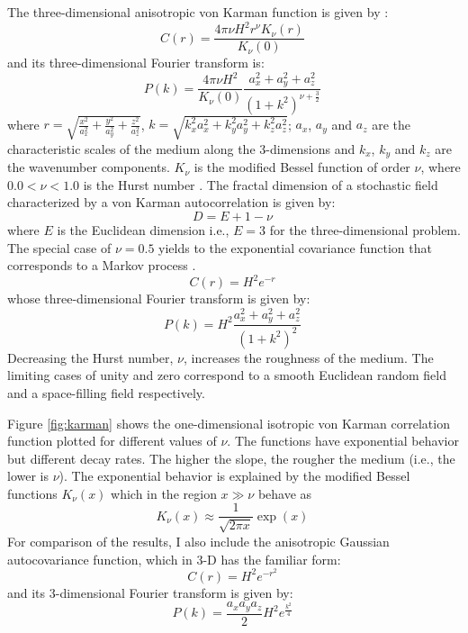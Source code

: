 The three-dimensional anisotropic von Karman function is given by \cite{Goff}:
\begin{equation}
C(r)=\frac{4\pi{\nu}H^2r^{\nu}K_{\nu}(r)}{K_{\nu}(0)} \
\label {eq7}
\end{equation}
and its three-dimensional Fourier transform is:
\begin{equation}
P(k)=\frac{4\pi{\nu}H^2}{K_{\nu}(0)}\frac{a_x^2+a_y^2+a_z^2}{{(1+k^2)}^{\nu+\frac {3} {2}}} \
\label {eq8}
\end{equation}
where $r=\sqrt{\frac{x^2}{a_x^2}+\frac{y^2}{a_y^2}+\frac{z^2}{a_z^2}}$,
 $k=\sqrt{k_x^2a_x^2+k_y^2a_y^2+k_z^2a_z^2}$;   
$a_x$, $a_y$ and $a_z$ are the characteristic scales of the medium along the 
3-dimensions and $k_x$, $k_y$ and $k_z$ are the wavenumber components. 
$K_\nu$ is the modified Bessel function of order $\nu$, 
where $0.0<\nu<1.0$ is the 
Hurst number \cite{Mandelbrot1,Mandelbrot2}. The fractal dimension of a stochastic
field characterized by a von Karman autocorrelation is given by:
\begin{equation}
D=E+1-\nu \
\label {eq0}
\end{equation}
where $E$ is the Euclidean dimension i.e., $E=3$ for the three-dimensional problem.
The special case of $\nu=0.5$ yields to the exponential covariance 
function that corresponds to a Markov process \cite{Feller}.
\begin{equation}
C(r)=H^2e^{-r} \
\label {eq9}
\end{equation}
whose three-dimensional Fourier transform is given by:
\begin{equation}
P(k)=H^2\frac{a_x^2+a_y^2+a_z^2}{{(1+k^2)}^{2}} \
\label {eq10}
\end{equation}
%
%
Decreasing the Hurst number, $\nu$, increases the roughness of the medium.
The limiting cases of unity and zero correspond to a smooth Euclidean random 
field and a space-filling field respectively.\\
%
\par
Figure \ref{fig:karman} shows the one-dimensional isotropic von Karman correlation 
function plotted
for different values of $\nu$. The functions have exponential behavior 
but different decay rates.
The higher the slope, the rougher the medium (i.e., the lower is $\nu$).
The exponential behavior is explained by the modified Bessel functions 
$K_\nu(x)$ which in the region $x \gg \nu$ behave as
\begin{equation}
K_\nu(x) \approx \frac {1} {\sqrt{2\pi x}} \exp{(x)} \
\label {eq11}
\end{equation}
%
For comparison of the results, I also include the anisotropic Gaussian 
autocovariance function, which in 3-D has the familiar form:
\begin{equation}
C(r)=H^2e^{-r^2} \
\label {eq5}
\end{equation}
and its 3-dimensional Fourier transform is given by:
\begin{equation}
P(k)=\frac{a_xa_ya_z}{2}H^2e^{\frac{k^2}{4}} \
\label {eq6}
\end{equation}

